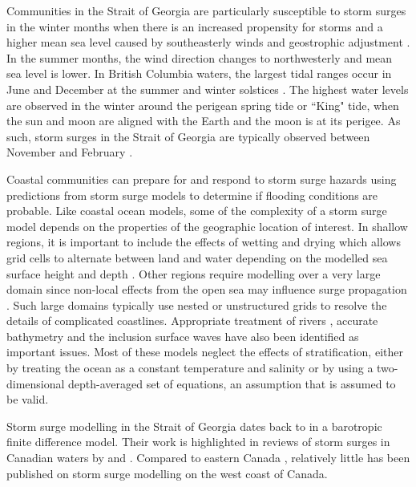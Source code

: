 \documentclass[pdftex,10pt]{article}
\begin{document}
Communities in the Strait of Georgia are particularly susceptible to storm surges in the winter months when there is an increased propensity for storms and a higher mean sea level caused by southeasterly winds and geostrophic adjustment \citep{danard2003storm}. In the summer months, the wind direction changes to northwesterly and mean sea level is lower. In British Columbia waters, the largest tidal ranges occur in June and December at the summer and winter solstices \citep{thomson1981oceanography}. The highest water levels are observed in the winter around the perigean spring tide or ``King" tide, when the sun and moon are aligned with the Earth and the moon is at its perigee. As such, storm surges in the Strait of Georgia are typically observed between November and February \citep{forseth2006adaptation}. 

Coastal communities can prepare for and respond to storm surge hazards using predictions from storm surge models to determine if flooding conditions are probable. Like coastal ocean models, some of the complexity of a storm surge model depends on the properties of the geographic location of interest. In shallow regions, it is important to include the effects of wetting and drying which allows grid cells to alternate between land and water depending on the modelled sea surface height and depth \citep{hubbert1999storm, weisberg2006hurricane}.  Other regions require modelling over a very large domain since non-local effects from the open sea may influence surge propagation \citep{weisberg2006hurricane, lane2009verification}. Such large domains typically use nested or unstructured grids to resolve the details of complicated coastlines. Appropriate treatment of rivers \citep{flather1994storm}, accurate bathymetry and the inclusion surface waves \citep{xu2010storm} have also been identified as important issues.  Most of these models neglect the effects of stratification, either by treating the ocean as a constant temperature and salinity or by using a two-dimensional depth-averaged set of equations, an assumption that is assumed to be valid. 

Storm surge modelling in the Strait of Georgia dates back to \citet{crean1988mathematical} in a barotropic finite difference model. Their work is highlighted in reviews of storm surges in Canadian waters by \citet{murty1995storm} and \citet{danard2003storm}.  Compared to eastern Canada \citep{gray1984preliminary, bernier2006predicting,bobanovic2006forecasting}, relatively little has been published on storm surge modelling on the west coast of Canada. 
\end{document}
